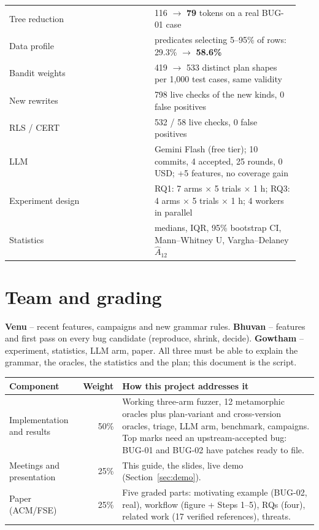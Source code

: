 \begin{longtable}{p{0.47\linewidth}p{0.47\linewidth}}
Tree reduction & 116 $\rightarrow$ \textbf{79} tokens on a real BUG-01 case \\
Data profile & predicates selecting 5--95\% of rows: 29.3\% $\rightarrow$ \textbf{58.6\%} \\
Bandit weights & 419 $\rightarrow$ 533 distinct plan shapes per 1{,}000 test cases, same validity \\
New rewrites & 798 live checks of the new kinds, 0 false positives \\
RLS / CERT & 532 / 58 live checks, 0 false positives \\
LLM & Gemini Flash (free tier); 10 commits, 4 accepted, 25 rounds, 0 USD; +5 features, no coverage gain \\
Experiment design & RQ1: 7 arms $\times$ 5 trials $\times$ 1 h; RQ3: 4 arms $\times$ 5 trials $\times$ 1 h; 4 workers in parallel \\
Statistics & medians, IQR, 95\% bootstrap CI, Mann--Whitney U, Vargha--Delaney $\hat A_{12}$ \\
\bottomrule
\end{longtable}

\section{Team and grading}

\textbf{Venu} -- recent \pg features, campaigns and new grammar rules.
\textbf{Bhuvan} -- features and first pass on every bug candidate (reproduce,
shrink, decide). \textbf{Gowtham} -- experiment, statistics, LLM arm, paper.
All three must be able to explain the grammar, the oracles, the statistics and
the plan; this document is the script.

\begin{tabularx}{\linewidth}{lrX}
\toprule
Component & Weight & How this project addresses it \\
\midrule
Implementation and results & 50\% & Working three-arm fuzzer, 12 metamorphic oracles plus plan-variant and cross-version oracles, triage, LLM arm, benchmark, campaigns. Top marks need an upstream-accepted bug: BUG-01 and BUG-02 have patches ready to file. \\
Meetings and presentation & 25\% & This guide, the slides, live demo (Section~\ref{sec:demo}). \\
Paper (ACM/FSE) & 25\% & Five graded parts: motivating example (BUG-02, real), workflow (figure + Steps 1--5), RQs (four), related work (17 verified references), threats. \\
\bottomrule
\end{tabularx}
